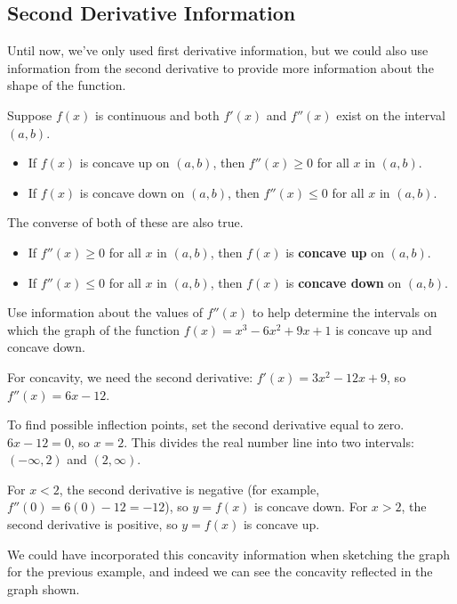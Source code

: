 \subsection{Second Derivative Information}
Until now, we've only used first derivative information, but we could also use information from the second derivative to provide more information about the shape of the function.

\begin{theorem}
Suppose $f(x)$ is continuous and both $f'(x)$ and $f''(x)$ exist on the interval $(a, b)$.
    \begin{itemize} 
    \item If $f(x)$ is concave up on $(a,b)$, then $f''(x)\ge 0$ for all $x$ in $(a,b)$.
    \item If $f(x)$ is concave down on $(a,b)$, then $f''(x)\le 0$ for all $x$ in $(a,b)$.
    \end{itemize}
The converse of both of these are also true.
    \begin{itemize}
    \item If $f''(x)\ge 0$ for all $x$ in $(a,b)$, then $f(x)$ is {\bf concave up} on $(a,b)$.
    \item If $f''(x)\le 0$ for all $x$ in $(a,b)$, then $f(x)$ is {\bf concave down} on $(a,b)$.
    \end{itemize}
\end{theorem}
\begin{example}
Use information about the values of $f''(x)$ to help determine the intervals on which the graph of the function $f(x)=x^3-6x^2+9x+1$ is concave up and concave down.

\begin{solution} For concavity, we need the second derivative: $f'(x)=3x^2-12x+9$, so $f''(x)=6x-12$.

To find possible inflection points, set the second derivative equal to zero. $6x-12=0$, so $x=2$. This divides the real number line into two intervals: $(-\infty, 2)$ and $(2, \infty)$.

For $x<2$, the second derivative is negative (for example, $f''(0)=6(0)-12=-12$), so $y=f(x)$ is concave down. For $x>2$, the second derivative is positive, so $y=f(x)$ is concave up.

We could have incorporated this concavity information when sketching the graph for the previous example, and indeed we can see the concavity reflected in the graph shown.
\end{solution}\end{example}

